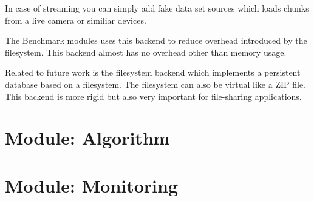In case of streaming you can simply add fake data set sources which loads chunks from a live camera or similiar devices.

The Benchmark modules uses this backend to reduce overhead introduced by the filesystem. This backend almost has no overhead other than memory usage.

Related to future work is the filesystem backend which implements a persistent database based on a filesystem. The filesystem can also be virtual like a ZIP file. This backend is more rigid but also very important for file-sharing applications.

\section{Module: Algorithm}
\label{sec:algorithm}

\section{Module: Monitoring}
\label{sec:monitoring}

